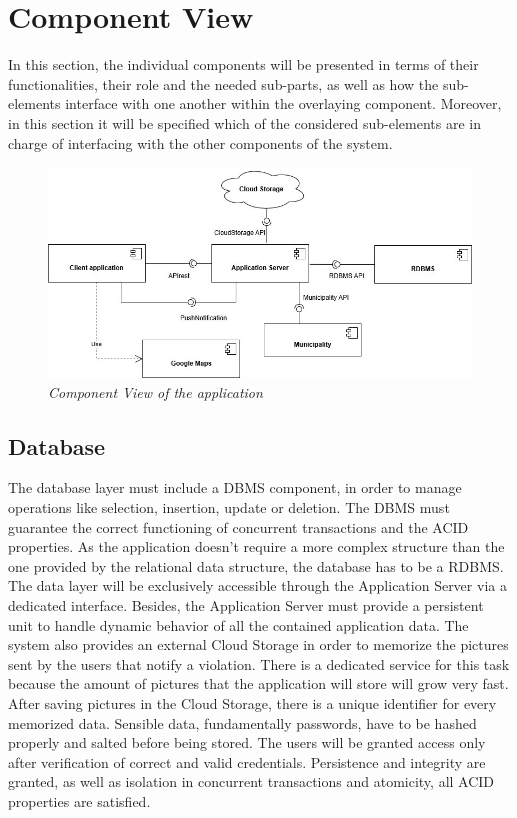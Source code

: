 \section{Component View}
In this section, the individual components will be presented in terms of their functionalities, their role and the 
needed sub-parts, as well as how the sub-elements interface with one another within the overlaying component. Moreover, 
in this section it will be specified which of the considered sub-elements are in charge of interfacing with the other 
components of the system.

\begin{figure}[H]
  \centering
  \includegraphics[origin=c,width=\textwidth]{DD_Images/ComponentView/componentView.jpg}
  \caption{\textit{Component View of the application}}
\end{figure}

\subsection{Database}
The database layer must include a DBMS component, in order to manage operations like selection, insertion, update or deletion.
The DBMS must guarantee the correct functioning of 
concurrent transactions and the ACID properties. As the application doesn’t require a more complex structure than the 
one provided by the relational data structure, the database has to be a RDBMS. The data layer will be exclusively 
accessible through the Application Server via a dedicated interface. Besides, the Application Server must provide a 
persistent unit to handle dynamic behavior of all the contained application data. 
\newline The system also provides an external Cloud Storage in order to memorize the pictures sent by the users that 
notify a violation. There is a dedicated service for this task because the amount of pictures that the application will
store will grow very fast. After saving pictures in the Cloud Storage, there is a unique identifier for every memorized data.
\newline Sensible data, fundamentally passwords, have to be hashed properly and salted before being stored. 
The users will be granted access only after verification of correct and valid credentials.
\newline Persistence and integrity are granted, as well as isolation in concurrent transactions and atomicity, all ACID properties 
are satisfied.

